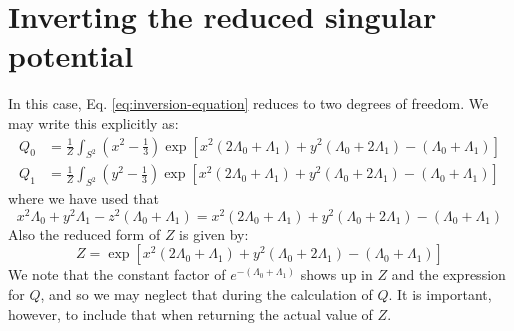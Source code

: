 \documentclass[reqno]{article}
\begin{document}
\section{Inverting the reduced singular potential}

In this case, Eq. \eqref{eq:inversion-equation} reduces to two degrees of freedom.
We may write this explicitly as:
\begin{align}
    Q_0
    &=
    \frac{1}{Z}
    \int_{S^2}
    \left( x^2 - \tfrac13 \right) 
    \exp \left[ 
        x^2 \left( 2\Lambda_0 + \Lambda_1 \right)
        + y^2 \left( \Lambda_0 + 2 \Lambda_1 \right)
        - \left( \Lambda_0 + \Lambda_1 \right)
    \right] \\
    Q_1
    &=
    \frac{1}{Z}
    \int_{S^2}
    \left( y^2 - \tfrac13 \right) 
    \exp \left[ 
        x^2 \left( 2\Lambda_0 + \Lambda_1 \right)
        + y^2 \left( \Lambda_0 + 2 \Lambda_1 \right)
        - \left( \Lambda_0 + \Lambda_1 \right)
    \right]
\end{align}
where we have used that
\begin{equation}
    x^2 \Lambda_0 + y^2 \Lambda_1 - z^2 (\Lambda_0 + \Lambda_1)
    =
    x^2 \left( 2\Lambda_0 + \Lambda_1 \right)
    + y^2 \left( \Lambda_0 + 2 \Lambda_1 \right)
    - \left( \Lambda_0 + \Lambda_1 \right)
\end{equation}
Also the reduced form of $Z$ is given by:
\begin{equation}
    Z
    =
    \exp \left[ 
        x^2 \left( 2\Lambda_0 + \Lambda_1 \right)
        + y^2 \left( \Lambda_0 + 2 \Lambda_1 \right)
        - \left( \Lambda_0 + \Lambda_1 \right)
    \right]
\end{equation}
We note that the constant factor of $e^{-(\Lambda_0 + \Lambda_1)}$ shows up in $Z$ and the expression for $Q$, and so we may neglect that during the calculation of $Q$.
It is important, however, to include that when returning the actual value of $Z$.
\end{document}
